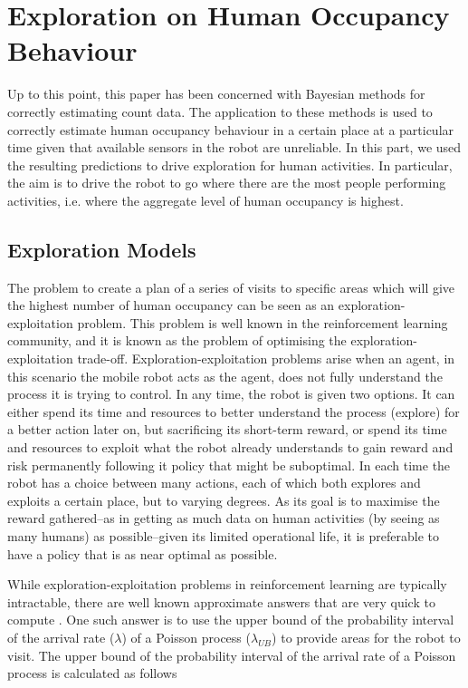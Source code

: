 
\section{Exploration on Human Occupancy Behaviour}
\label{sec:exploration}

Up to this point, this paper has been concerned with Bayesian methods for correctly estimating count data. The application to these methods is used to correctly estimate human occupancy behaviour in a certain place at a particular time given that available sensors in the robot are unreliable. In this part, we used the resulting predictions to drive exploration for human activities. In particular, the aim is to drive the robot to go where there are the most people performing activities, i.e. where the aggregate level of human occupancy is highest. 

\subsection*{Exploration Models}

The problem to create a plan of a series of visits to specific areas which will give the highest number of human occupancy can be seen as an exploration-exploitation problem. This problem is well known in the reinforcement learning community, and it is known as the problem of optimising the exploration-exploitation trade-off. Exploration-exploitation problems arise when an agent, in this scenario the mobile robot acts as the agent, does not fully understand the process it is trying to control. In any time, the robot is given two options. It can either spend its time and resources to better understand the process (explore) for a
better action later on, but sacrificing its short-term reward, or spend its time and resources to exploit what the robot already understands to gain reward and risk permanently following it policy that might be suboptimal. In each time the robot has a choice between many actions, each of which both explores and exploits a certain place, but to varying degrees. As its goal is to maximise the reward gathered–as in getting as much data on human activities (by seeing as many humans) as possible–given its limited operational life, it is preferable to have a policy that is as near optimal as possible.

While exploration-exploitation problems in reinforcement learning are typically intractable, there are well known approximate answers that are very quick to compute \cite{wyatt1998exploration, 1413255, AUDIBERT20091876}. One such answer is to use the upper bound of the probability interval of the arrival rate ($\lambda$) of a Poisson process ($\lambda_{UB}$) to provide areas for the robot to visit. The upper bound of the probability interval of the arrival rate of a Poisson process is calculated as follows

